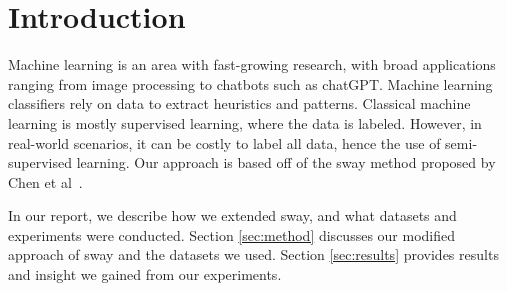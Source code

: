 \section{Introduction}
\label{sec:intro}

Machine learning is an area with fast-growing research, with broad applications
ranging from image processing to chatbots such as chatGPT. Machine
learning classifiers rely on data to extract heuristics and patterns.
Classical machine learning is mostly supervised learning, where the data
is labeled. However, in real-world scenarios, it can be costly to label
all data, hence the use of semi-supervised learning. Our approach is
based off of the sway method proposed by Chen et
al~\cite{chen2018sampling}. 

In our report, we describe how we extended sway, and what datasets and
experiments were conducted. Section \ref{sec:method} discusses our
modified approach of sway and the
datasets we used. Section \ref{sec:results} provides results and
insight we gained from our experiments.


